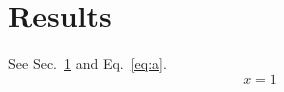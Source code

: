 \documentclass{article}
\begin{document}
\section{Results}\label{sec:r}
See Sec.~\ref{sec:r} and Eq.~\eqref{eq:a}.
\begin{equation} x = 1 \label{eq:a} \end{equation}
\end{document}
